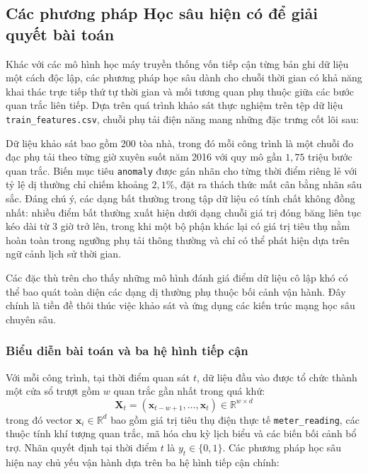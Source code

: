 \subsection{Các phương pháp Học sâu hiện có để giải quyết bài toán}

Khác với các mô hình học máy truyền thống vốn tiếp cận từng bản ghi dữ liệu một cách độc lập, các phương pháp học sâu dành cho chuỗi thời gian có khả năng khai thác trực tiếp thứ tự thời gian và mối tương quan phụ thuộc giữa các bước quan trắc liên tiếp. Dựa trên quá trình khảo sát thực nghiệm trên tệp dữ liệu \texttt{train\_features.csv}, chuỗi phụ tải điện năng mang những đặc trưng cốt lõi sau:

Dữ liệu khảo sát bao gồm 200 tòa nhà, trong đó mỗi công trình là một chuỗi đo đạc phụ tải theo từng giờ xuyên suốt năm 2016 với quy mô gần $1{,}75$ triệu bước quan trắc. Biến mục tiêu \texttt{anomaly} được gán nhãn cho từng thời điểm riêng lẻ với tỷ lệ dị thường chỉ chiếm khoảng $2{,}1\%$, đặt ra thách thức mất cân bằng nhãn sâu sắc. Đáng chú ý, các dạng bất thường trong tập dữ liệu có tính chất không đồng nhất: nhiều điểm bất thường xuất hiện dưới dạng chuỗi giá trị đóng băng liên tục kéo dài từ 3 giờ trở lên, trong khi một bộ phận khác lại có giá trị tiêu thụ nằm hoàn toàn trong ngưỡng phụ tải thông thường và chỉ có thể phát hiện dựa trên ngữ cảnh lịch sử thời gian.

Các đặc thù trên cho thấy những mô hình đánh giá điểm dữ liệu cô lập khó có thể bao quát toàn diện các dạng dị thường phụ thuộc bối cảnh vận hành. Đây chính là tiền đề thôi thúc việc khảo sát và ứng dụng các kiến trúc mạng học sâu chuyên sâu.

\subsubsection{Biểu diễn bài toán và ba hệ hình tiếp cận}

Với mỗi công trình, tại thời điểm quan sát $t$, dữ liệu đầu vào được tổ chức thành một cửa sổ trượt gồm $w$ quan trắc gần nhất trong quá khứ:
\begin{equation*}
    \mathbf{X}_t = \left(\mathbf{x}_{t-w+1}, \ldots, \mathbf{x}_{t}\right) \in \mathbb{R}^{w \times d}
\end{equation*}
trong đó vector $\mathbf{x}_i \in \mathbb{R}^d$ bao gồm giá trị tiêu thụ điện thực tế \texttt{meter\_reading}, các thuộc tính khí tượng quan trắc, mã hóa chu kỳ lịch biểu và các biến bối cảnh bổ trợ. Nhãn quyết định tại thời điểm $t$ là $y_t \in \{0, 1\}$. Các phương pháp học sâu hiện nay chủ yếu vận hành dựa trên ba hệ hình tiếp cận chính:

